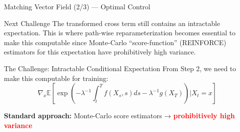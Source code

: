 \documentclass[aspectratio=169,xcolor=dvipsnames]{beamer}
\begin{document}
\begin{frame}[allowframebreaks]{Matching Vector Field (2/3) — Optimal Control}
    \begin{alertblock}{Next Challenge}
        The transformed cross term still contains an intractable expectation. This is where path-wise reparameterization becomes essential to make this computable since
        Monte-Carlo “score-function” (REINFORCE) estimators for this expectation have prohibitively high variance.
    \end{alertblock}

    \begin{block}{The Challenge: Intractable Conditional Expectation}
        From Step 2, we need to make this computable for training:
        $$\nabla_x \mathbb{E}\left[\exp\left(-\lambda^{-1}\int_t^T f(X_s,s)ds - \lambda^{-1}g(X_T)\right) \bigg| X_t = x\right]$$
        
        \textbf{Standard approach:} Monte-Carlo score estimators → \textcolor{red}{\textbf{prohibitively high variance}}
    \end{block}
    
    \vspace{0.5cm}

\end{frame}
\end{document}

